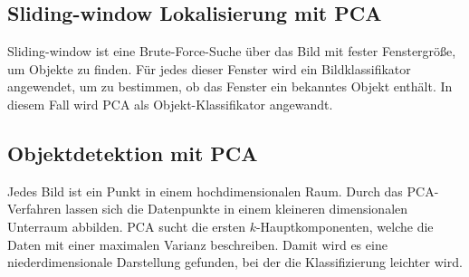 \subsection{Sliding-window Lokalisierung mit PCA}
Sliding-window ist eine Brute-Force-Suche über das Bild mit fester Fenstergröße, um Objekte zu finden. Für jedes dieser Fenster wird ein Bildklassifikator angewendet, um zu bestimmen, ob das Fenster ein bekanntes Objekt enthält. In diesem Fall wird PCA als Objekt-Klassifikator angewandt.
\subsection{Objektdetektion mit PCA}
Jedes Bild ist ein Punkt in einem hochdimensionalen Raum. Durch das PCA-Verfahren lassen sich die Datenpunkte in einem kleineren dimensionalen Unterraum abbilden. PCA sucht die ersten $k$-Hauptkomponenten, welche die Daten mit einer maximalen Varianz beschreiben. Damit wird es eine niederdimensionale Darstellung gefunden, bei der die Klassifizierung leichter wird.\\


